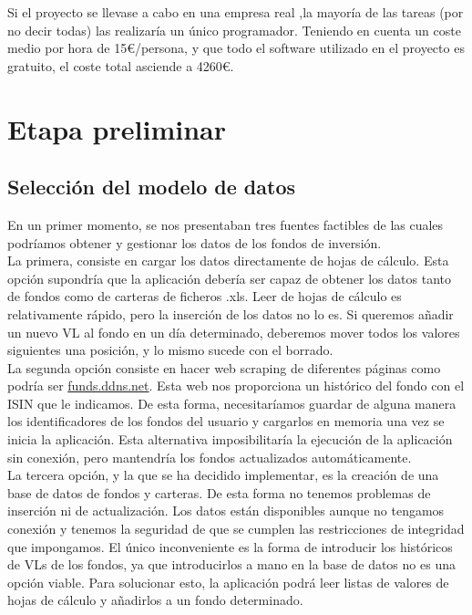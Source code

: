 \documentclass[12pt, a4paper]{book}
\begin{document}
Si el proyecto se llevase a cabo en una empresa real ,la mayoría de las tareas (por no decir todas) las realizaría un único programador. Teniendo en cuenta un coste medio por hora de 15€/persona, y que todo el software utilizado en el proyecto es gratuito, el coste total asciende a 4260€.


\newpage
\chapter{Etapa preliminar}

\section{Selección del modelo de datos}

En un primer momento, se nos presentaban tres fuentes factibles de las cuales podríamos obtener y gestionar los datos de los fondos de inversión.\\

La primera, consiste en cargar los datos directamente de hojas de cálculo. Esta opción supondría que la aplicación debería ser capaz de obtener los datos tanto de fondos como de carteras de ficheros .xls. Leer de hojas de cálculo es relativamente rápido, pero la inserción de los datos no lo es. Si queremos añadir un nuevo \gls{VL} al fondo en un día determinado, deberemos mover todos los valores siguientes una posición, y lo mismo sucede con el borrado.\\

La segunda opción consiste en hacer web scraping de diferentes páginas como podría ser \href{https://funds.ddns.net/}{funds.ddns.net}. Esta web nos proporciona un histórico del fondo con el ISIN que le indicamos. De esta forma, necesitaríamos guardar de alguna manera los identificadores de los fondos del usuario y cargarlos en memoria una vez se inicia la aplicación. Esta alternativa imposibilitaría la ejecución de la aplicación sin conexión, pero mantendría los fondos actualizados automáticamente.\\

La tercera opción, y la que se ha decidido implementar, es la creación de una base de datos de fondos y carteras. De esta forma no tenemos problemas de inserción ni de actualización. Los datos están disponibles aunque no tengamos conexión y tenemos la seguridad de que se cumplen las restricciones de integridad que impongamos. El único inconveniente es la forma de introducir los históricos de \gls{VL}s de los fondos, ya que introducirlos a mano en la base de datos no es una opción viable. Para solucionar esto, la aplicación podrá leer listas de valores de hojas de cálculo y añadirlos a un fondo determinado.
\end{document}
